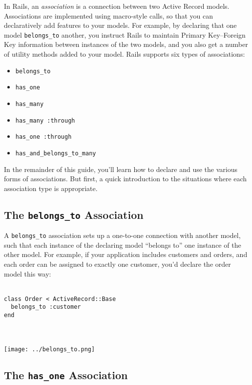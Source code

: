 \documentclass[10pt]{book}
\begin{document}
In Rails, an \emph{association} is a connection between two Active  Record models. Associations are implemented using macro-style calls, so  that you can declaratively add features to your models. For example, by  declaring that one model \texttt{belongs\_to} another, you instruct Rails  to maintain Primary Key–Foreign Key information between instances of  the two models, and you also get a number of utility methods added to  your model. Rails supports six types of associations:
\begin{itemize}
	\item \texttt{belongs\_to}
	\item \texttt{has\_one}
	\item \texttt{has\_many}
	\item \texttt{has\_many :through}
	\item \texttt{has\_one :through}
	\item \texttt{has\_and\_belongs\_to\_many}
\end{itemize}

In the remainder of this guide, you’ll learn how to declare and use  the various forms of associations. But first, a quick introduction to  the situations where each association type is appropriate.

\subsection{ The \texttt{belongs\_to} Association}

A \texttt{belongs\_to} association sets up a one-to-one connection  with another model, such that each instance of the declaring model  “belongs to” one instance of the other model. For example, if your  application includes customers and orders, and each order can be  assigned to exactly one customer, you’d declare the order model this  way:
\\ \\
\begin{minipage}{\textwidth}{\scriptsize
\begin{verbatim}
class Order < ActiveRecord::Base
  belongs_to :customer
end
\end{verbatim}}
\end{minipage}
\\ \\


\texttt{[image: ../belongs\_to.png]}

\subsection{ The \texttt{has\_one} Association}
\end{document}
